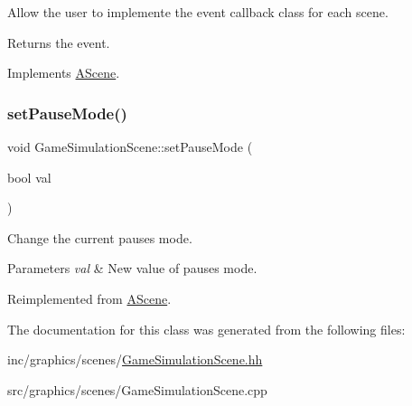 Allow the user to implemente the event callback class for each scene. 

\begin{DoxyReturn}{Returns}
the event. 
\end{DoxyReturn}


Implements \hyperlink{classAScene_af521e5e6d30a5d2e5d30eb333e4d3abd}{A\+Scene}.

\mbox{\label{classGameSimulationScene_a34377bab69b7a81e50f3d2c42596c574}} 
\subsubsection{\texorpdfstring{set\+Pause\+Mode()}{setPauseMode()}}
{\footnotesize\ttfamily void Game\+Simulation\+Scene\+::set\+Pause\+Mode (\begin{DoxyParamCaption}\item[{bool}]{val }\end{DoxyParamCaption})\hspace{0.3cm}{\ttfamily [virtual]}}



Change the current pause\textquotesingle{}s mode. 


\begin{DoxyParams}{Parameters}
{\em val} & New value of pause\textquotesingle{}s mode. \\
\hline
\end{DoxyParams}


Reimplemented from \hyperlink{classAScene_a7ff45d7a24796f52d815c00770900339}{A\+Scene}.



The documentation for this class was generated from the following files\+:\begin{DoxyCompactItemize}
\item 
inc/graphics/scenes/\hyperlink{GameSimulationScene_8hh}{Game\+Simulation\+Scene.\+hh}\item 
src/graphics/scenes/Game\+Simulation\+Scene.\+cpp\end{DoxyCompactItemize}
